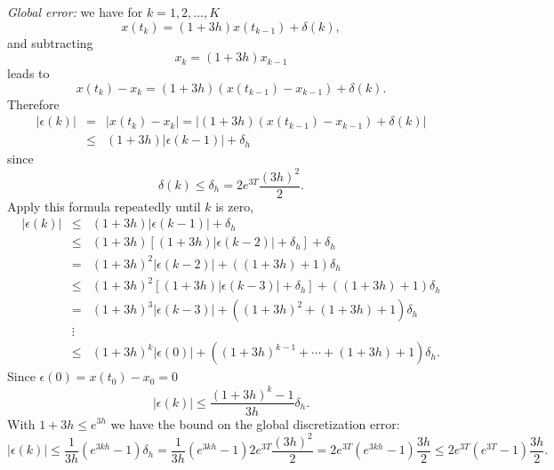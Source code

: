 \documentclass{ximera}
\begin{document}
\begin{exercise}
\begin{solution}
{\em Global error:} we have for $k=1,2,\ldots,K$
\[
x(t_k)=(1+3h)x(t_{k-1})+\delta(k),
\]
and subtracting
\[
x_k = (1+3h)x_{k-1}
\]
leads to
\[
x(t_k) - x_k = (1+3h)(x(t_{k-1})-x_{k-1})+\delta(k).
\]
Therefore
\begin{eqnarray*}
|\epsilon(k)| & = & |x(t_k) - x_k| =
|(1+3h)(x(t_{k-1})-x_{k-1})+\delta(k)|\\
& \le & (1+3h)|\epsilon(k-1)|+\delta_h
\end{eqnarray*}
since
\[
\delta(k)\le \delta_h = 2e^{3T}\frac{(3h)^2}{2}.
\]
Apply this formula repeatedly until $k$ is zero,
\[
\begin{array}{rcl}
|\epsilon(k)|&\le&(1+3h)|\epsilon(k-1)|+\delta_h\\
&\le& (1+3h)[(1+3h)|\epsilon(k-2)|+\delta_h]+\delta_h\\
&=& (1+3h)^2|\epsilon(k-2)| + ((1+3h) + 1)\delta_h\\
&\le& (1+3h)^2[(1+3h)|\epsilon(k-3)|+\delta_h] + ((1+3h) + 1)\delta_h\\
&=& (1+3h)^3|\epsilon(k-3)| + ((1+3h)^2 + (1+3h) + 1)\delta_h\\
&\vdots& \\
&\le & (1+3h)^k|\epsilon(0)| + ((1+3h)^{k-1} +\cdots + (1+3h) + 1)\delta_h.
\end{array}
\]
Since $\epsilon(0)=x(t_0) - x_0=0$
\[
|\epsilon(k)| \le \frac{(1+3h)^k -1}{3h}\delta_h.
\]
With $1+3h\le e^{3h}$ we have the bound on the global discretization error:
\[
|\epsilon(k)| \le \frac{1}{3h} (e^{3kh}-1)\delta_h=
\frac{1}{3h}(e^{3kh}-1)2e^{3T}\frac{(3h)^2}{2} =
2e^{3T}(e^{3kh}-1)\frac{3h}{2}
\le 2e^{3T}(e^{3T}-1)\frac{3h}{2}.
\]

\end{solution}
\end{exercise}
\end{document}
